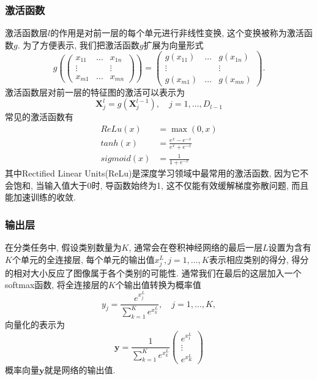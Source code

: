 \subsubsection{激活函数}
激活函数层$l$的作用是对前一层的每个单元进行非线性变换, 这个变换被称为激活函数$g$. 为了方便表示, 我们把激活函数$g$扩展为向量形式
\begin{equation}
    g(
    \begin{pmatrix}
        x_{11} & \dots & x_{1n}\\
        \vdots & & \vdots\\
        x_{m1} & \dots & x_{mn}
    \end{pmatrix}
    )
    =
    \begin{pmatrix}
        g(x_{11}) & \dots & g(x_{1n})\\
        \vdots & & \vdots\\
        g(x_{m1}) & \dots & g(x_{mn})
    \end{pmatrix}.
\end{equation}
激活函数层对前一层的特征图的激活可以表示为
\begin{equation}
    \boldsymbol{X}_j^l = g(\boldsymbol{X}_j^{l-1}), \quad j = 1, \dots, D_{l-1}
\end{equation}
常见的激活函数有
\begin{align}
    ReLu(x) &= \max(0, x)\\
    tanh(x) &= \frac{e^x - e^{-x}}{e^x + e^{-x}}\\
    sigmoid(x) &= \frac{1}{1 + e^{-x}}
\end{align}
其中Rectified Linear Units(ReLu)是深度学习领域中最常用的激活函数, 因为它不会饱和, 当输入值大于0时, 导函数始终为1, 这不仅能有效缓解梯度弥散问题, 而且能加速训练的收敛.

\subsubsection{输出层}
在分类任务中, 假设类别数量为$K$, 通常会在卷积神经网络的最后一层$L$设置为含有$K$个单元的全连接层, 每个单元的输出值$x_j^L, j=1, \dots, K$表示相应类别的得分, 得分的相对大小反应了图像属于各个类别的可能性. 通常我们在最后的这层加入一个softmax函数, 将全连接层的$K$个输出值转换为概率值
\begin{equation}
    y_j = \frac{e^{x_j^L}}{\sum_{k=1}^K e^{x_k^L}}, \quad j = 1, \dots, K,
\end{equation}
向量化的表示为
\begin{equation}
    \boldsymbol{y} = \frac{1}{\sum_{k=1}^K e^{x_k^L}}
    \begin{pmatrix}
        e^{x_1^L}\\
        \vdots\\
        e^{x_K^L}
    \end{pmatrix}
\end{equation}
概率向量$\boldsymbol{y}$就是网络的输出值.

